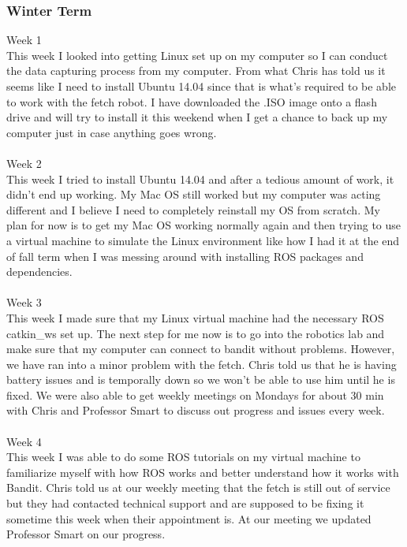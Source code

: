 \documentclass[draftclsnofoot, onecolumn, 10pt, compsoc]{IEEEtran}
\begin{document}
  \subsubsection{Winter Term}
  Week 1 \\
\indent This week I looked into getting Linux set up on my computer so I can conduct the data capturing process from my computer. From what Chris has told us it seems like I need to install Ubuntu 14.04 since that is what's required to be able to work with the fetch robot. I have downloaded the .ISO image onto a flash drive and will try to install it this weekend when I get a chance to back up my computer just in case anything goes wrong.\\\\
  Week 2 \\
\indent This week I tried to install Ubuntu 14.04 and after a tedious amount of work, it didn't end up working. My Mac OS still worked but my computer was acting different and I believe I need to completely reinstall my OS from scratch. My plan for now is to get my Mac OS working normally again and then trying to use a virtual machine to simulate the Linux environment like how I had it at the end of fall term when I was messing around with installing ROS packages and dependencies.\\\\
  Week 3 \\
\indent This week I made sure that my Linux virtual machine had the necessary ROS catkin\_ws set up. The next step for me now is to go into the robotics lab and make sure that my computer can connect to bandit without problems. However, we have ran into a minor problem with the fetch. Chris told us that he is having battery issues and is temporally down so we won't be able to use him until he is fixed. We were also able to get weekly meetings on Mondays for about 30 min with Chris and Professor Smart to discuss out progress and issues every week. \\\\
  Week 4 \\
\indent This week I was able to do some ROS tutorials on my virtual machine to familiarize myself with how ROS works and better understand how it works with Bandit. Chris told us at our weekly meeting that the fetch is still out of service but they had contacted technical support and are supposed to be fixing it sometime this week when their appointment is. At our meeting we updated Professor Smart on our progress. \\\\
\end{document}
